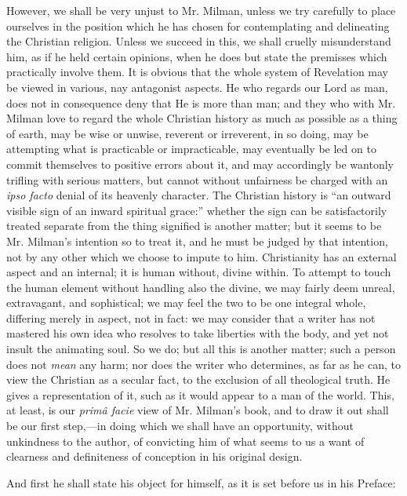 However, we shall be very unjust to Mr. Milman,
unless we try carefully to place ourselves in the position which he
has chosen for contemplating and delineating the Christian religion.
Unless we succeed in this, we shall cruelly misunderstand him, as if
he held certain opinions, when he does but state the premisses which
practically involve them. It is obvious that the whole system of
Revelation may be viewed in various, nay antagonist aspects. He who
regards our Lord as man, does not in consequence deny that He is more
than man; and they who with Mr. Milman love to regard the whole
Christian history as much as possible as a thing of earth, may
be wise or unwise, reverent or irreverent, in so doing, may be
attempting what is practicable or impracticable, may eventually be led
on to commit themselves to positive errors about it, and may
accordingly be wantonly trifling with serious matters, but cannot
without unfairness be charged with an \emph{ipso facto} denial of its
heavenly character. The Christian history is ``an outward visible sign
of an inward spiritual grace:'' whether the sign can be satisfactorily
treated separate from the thing signified is another matter; but it
seems to be Mr. Milman's intention so to treat it, and he must be
judged by that intention, not by any other which we choose to impute
to him. Christianity has an external aspect and an internal; it is
human without, divine within. To attempt to touch the human element
without handling also the divine, we may fairly deem unreal,
extravagant, and sophistical; we may feel the two to be one integral
whole, differing merely in aspect, not in fact: we may consider that a
writer has not mastered his own idea who resolves to take liberties
with the body, and yet not insult the animating soul. So we do; but
all this is another matter; such a person does not \emph{mean} any
harm; nor does the writer who determines, as far as he can, to view
the Christian as a secular fact, to the exclusion of all theological
truth. He gives a representation of it, such as it would appear to a
man of the world. This, at least, is our \emph{primâ facie} view of
Mr. Milman's book, and to draw it out shall be our first step,—in
doing which we shall have an opportunity, without unkindness to the
author, of convicting him of what seems to us a want of clearness and
definiteness of conception in his original design.

And first he shall state his object for himself,
as it is set before us in his Preface:

